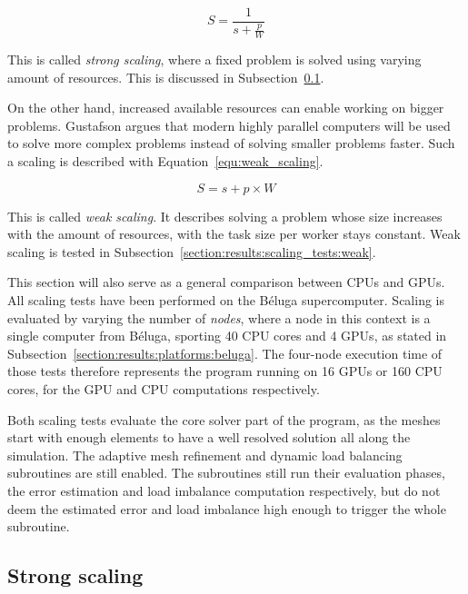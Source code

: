 \begin{equation} \label{equ:strong_scaling}
	S = \frac{1}{s + \frac{p}{W}}
\end{equation}

This is called \textit{strong scaling}, where a fixed problem is solved using varying amount of
resources. This is discussed in Subsection~\ref{section:results:scaling_tests:strong}.

On the other hand, increased available resources can enable working on bigger problems. Gustafson
argues that modern highly parallel computers will be used to solve more complex problems instead of
solving smaller problems faster. Such a scaling is described with Equation~\ref{equ:weak_scaling}.

\begin{equation} \label{equ:weak_scaling}
	S = s + p \times W
\end{equation}

This is called \textit{weak scaling}. It describes solving a problem whose size increases with the
amount of resources, with the task size per worker stays constant. Weak scaling is tested in
Subsection~\ref{section:results:scaling_tests:weak}.

This section will also serve as a general comparison between CPUs and GPUs. All scaling tests have
been performed on the Béluga supercomputer. Scaling is evaluated by varying the number of
\textit{nodes}, where a node in this context is a single computer from Béluga, sporting 40 CPU cores
and 4 GPUs, as stated in Subsection~\ref{section:results:platforms:beluga}. The four-node execution
time of those tests therefore represents the program running on 16 GPUs or 160 CPU cores, for the
GPU and CPU computations respectively.

Both scaling tests evaluate the core solver part of the program, as the meshes start with enough
elements to have a well resolved solution all along the simulation. The adaptive mesh refinement and
dynamic load balancing subroutines are still enabled. The subroutines still run their evaluation
phases, the error estimation and load imbalance computation respectively, but do not deem the
estimated error and load imbalance high enough to trigger the whole subroutine. 

\subsection{Strong scaling} \label{section:results:scaling_tests:strong}


